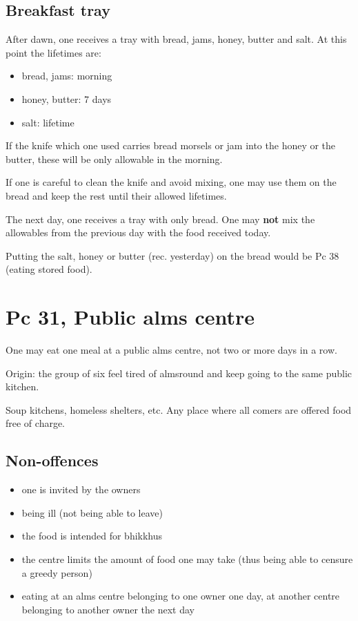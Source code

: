 \subsection{Breakfast tray}

After dawn, one receives a tray with bread, jams, honey, butter and
salt. At this point the lifetimes are:

\begin{itemize}
\tightlist
\item
  bread, jams: morning
\item
  honey, butter: 7 days
\item
  salt: lifetime
\end{itemize}

If the knife which one used carries bread morsels or jam into the honey
or the butter, these will be only allowable in the morning.

If one is careful to clean the knife and avoid mixing, one may use them
on the bread and keep the rest until their allowed lifetimes.

The next day, one receives a tray with only bread. One may \textbf{not}
mix the allowables from the previous day with the food received today.

Putting the salt, honey or butter (rec. yesterday) on the bread would be
Pc 38 (eating stored food).

\section{Pc 31, Public alms centre}

One may eat one meal at a public alms centre, not two or more days in a
row.

Origin: the group of six feel tired of almsround and keep going to the
same public kitchen.

Soup kitchens, homeless shelters, etc. Any place where all comers are
offered food free of charge.

\subsection{Non-offences}

\begin{itemize}
\tightlist
\item
  one is invited by the owners
\item
  being ill (not being able to leave)
\item
  the food is intended for bhikkhus
\item
  the centre limits the amount of food one may take (thus being able to
  censure a greedy person)
\item
  eating at an alms centre belonging to one owner one day, at another
  centre belonging to another owner the next day
\end{itemize}

